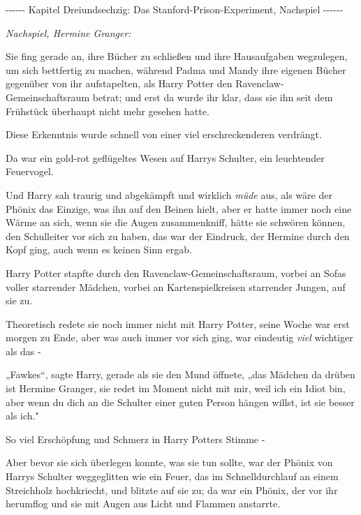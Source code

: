 

\hypertarget{das-stanford-prison-experiment-nachspiel}{%

-\/-\/-\/-\/-\/- Kapitel Dreiundsechzig: Das Stanford-Prison-Experiment, Nachspiel -\/-\/-\/-\/-\/-

\emph{\emph{Nachspiel, Hermine Granger:}}

Sie fing gerade an, ihre Bücher zu schließen und ihre Hausaufgaben wegzulegen, um sich bettfertig zu machen, während Padma und Mandy ihre eigenen Bücher gegenüber von ihr aufstapelten, als Harry Potter den Ravenclaw-Gemeinschaftsraum betrat; und erst da wurde ihr klar, dass sie ihn seit dem Frühstück überhaupt nicht mehr gesehen hatte.

Diese Erkenntnis wurde schnell von einer viel erschreckenderen verdrängt.

Da war ein gold-rot geflügeltes Wesen auf Harrys Schulter, ein leuchtender Feuervogel.

Und Harry sah traurig und abgekämpft und wirklich \emph{müde} aus, als wäre der Phönix das Einzige, was ihn auf den Beinen hielt, aber er hatte immer noch eine Wärme an sich, wenn sie die Augen zusammenkniff, hätte sie schwören können, den Schulleiter vor sich zu haben, das war der Eindruck, der Hermine durch den Kopf ging, auch wenn es keinen Sinn ergab.

Harry Potter stapfte durch den Ravenclaw-Gemeinschaftsraum, vorbei an Sofas voller starrender Mädchen, vorbei an Kartenspielkreisen starrender Jungen, auf sie zu.

Theoretisch redete sie noch immer nicht mit Harry Potter, seine Woche war erst morgen zu Ende, aber was auch immer vor sich ging, war eindeutig \emph{viel} wichtiger als das -

„Fawkes“, sagte Harry, gerade als sie den Mund öffnete, „das Mädchen da drüben ist Hermine Granger, sie redet im Moment nicht mit mir, weil ich ein Idiot bin, aber wenn du dich an die Schulter einer guten Person hängen willst, ist sie besser als ich."

So viel Erschöpfung und Schmerz in Harry Potters Stimme -

Aber bevor sie sich überlegen konnte, was sie tun sollte, war der Phönix von Harrys Schulter weggeglitten wie ein Feuer, das im Schnelldurchlauf an einem Streichholz hochkriecht, und blitzte auf sie zu; da war ein Phönix, der vor ihr herumflog und sie mit Augen aus Licht und Flammen anstarrte.

}
